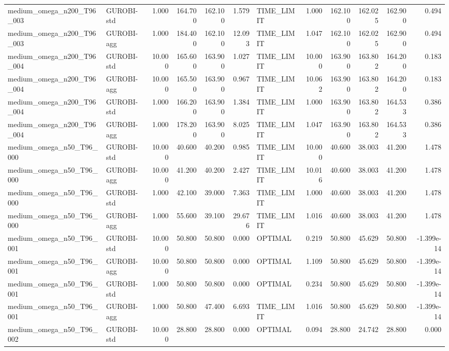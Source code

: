 \begin{table}[htbp]
\begin{tabular}{llrrrrlrrrrr}
medium\_omega\_n200\_T96\_003 & GUROBI-std & 1.000 & 164.700 & 162.100 & 1.579 & TIME\_LIMIT & 1.000 & 162.100 & 162.025 & 162.900 & 0.494 \\
medium\_omega\_n200\_T96\_003 & GUROBI-agg & 1.000 & 184.400 & 162.100 & 12.093 & TIME\_LIMIT & 1.047 & 162.100 & 162.025 & 162.900 & 0.494 \\
medium\_omega\_n200\_T96\_004 & GUROBI-std & 10.000 & 165.600 & 163.900 & 1.027 & TIME\_LIMIT & 10.000 & 163.900 & 163.802 & 164.200 & 0.183 \\
medium\_omega\_n200\_T96\_004 & GUROBI-agg & 10.000 & 165.500 & 163.900 & 0.967 & TIME\_LIMIT & 10.062 & 163.900 & 163.802 & 164.200 & 0.183 \\
medium\_omega\_n200\_T96\_004 & GUROBI-std & 1.000 & 166.200 & 163.900 & 1.384 & TIME\_LIMIT & 1.000 & 163.900 & 163.802 & 164.533 & 0.386 \\
medium\_omega\_n200\_T96\_004 & GUROBI-agg & 1.000 & 178.200 & 163.900 & 8.025 & TIME\_LIMIT & 1.047 & 163.900 & 163.802 & 164.533 & 0.386 \\
medium\_omega\_n50\_T96\_000 & GUROBI-std & 10.000 & 40.600 & 40.200 & 0.985 & TIME\_LIMIT & 10.000 & 40.600 & 38.003 & 41.200 & 1.478 \\
medium\_omega\_n50\_T96\_000 & GUROBI-agg & 10.000 & 41.200 & 40.200 & 2.427 & TIME\_LIMIT & 10.016 & 40.600 & 38.003 & 41.200 & 1.478 \\
medium\_omega\_n50\_T96\_000 & GUROBI-std & 1.000 & 42.100 & 39.000 & 7.363 & TIME\_LIMIT & 1.000 & 40.600 & 38.003 & 41.200 & 1.478 \\
medium\_omega\_n50\_T96\_000 & GUROBI-agg & 1.000 & 55.600 & 39.100 & 29.676 & TIME\_LIMIT & 1.016 & 40.600 & 38.003 & 41.200 & 1.478 \\
medium\_omega\_n50\_T96\_001 & GUROBI-std & 10.000 & 50.800 & 50.800 & 0.000 & OPTIMAL & 0.219 & 50.800 & 45.629 & 50.800 & -1.399e-14 \\
medium\_omega\_n50\_T96\_001 & GUROBI-agg & 10.000 & 50.800 & 50.800 & 0.000 & OPTIMAL & 1.109 & 50.800 & 45.629 & 50.800 & -1.399e-14 \\
medium\_omega\_n50\_T96\_001 & GUROBI-std & 1.000 & 50.800 & 50.800 & 0.000 & OPTIMAL & 0.234 & 50.800 & 45.629 & 50.800 & -1.399e-14 \\
medium\_omega\_n50\_T96\_001 & GUROBI-agg & 1.000 & 50.800 & 47.400 & 6.693 & TIME\_LIMIT & 1.016 & 50.800 & 45.629 & 50.800 & -1.399e-14 \\
medium\_omega\_n50\_T96\_002 & GUROBI-std & 10.000 & 28.800 & 28.800 & 0.000 & OPTIMAL & 0.094 & 28.800 & 24.742 & 28.800 & 0.000 \\

\end{tabular}
\end{table}
